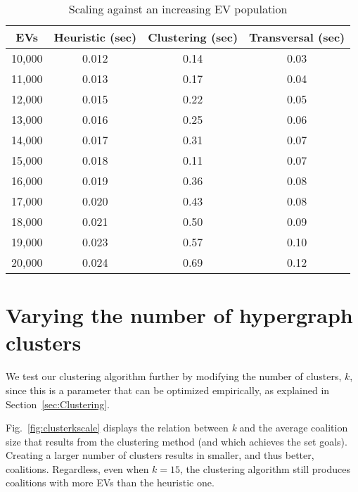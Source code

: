 	\begin{table}		
		\begin{center}
			\begin{tabular}{| c || c | c | c | }
				\hline
				EVs   & Heuristic (sec) & Clustering (sec) & Transversal (sec) \\ \hline
				10,000 & 0.012 & 0.14 & 0.03  \\ \hline
				11,000 & 0.013 & 0.17 & 0.04\\ \hline
				12,000 & 0.015 & 0.22 & 0.05\\ \hline
				13,000 & 0.016 & 0.25 & 0.06  \\ \hline
				14,000 & 0.017 & 0.31 & 0.07\\ \hline
				15,000 & 0.018 & 0.11 & 0.07\\ \hline
				16,000 & 0.019 & 0.36 & 0.08 \\ \hline
				17,000 & 0.020 & 0.43 & 0.08\\ \hline
				18,000 & 0.021 & 0.50 & 0.09 \\ \hline
				19,000 & 0.023 & 0.57 & 0.10  \\ \hline
				20,000 & 0.024 & 0.69 & 0.12\\ \hline
			\end{tabular}
		\end{center}
		\caption{Scaling against an increasing EV population\label{tab:popscale}}
	\end{table}

\section{Varying the number of hypergraph clusters} \label{sec:results_modifications}
We test our clustering algorithm further by modifying the number of clusters, $k$, since this is a parameter that can be optimized empirically, as explained in Section~\ref{sec:Clustering}.

Fig.~\ref{fig:clusterkscale} displays the relation between \textit{k} and the average coalition size that results from the clustering method (and which achieves the set goals). Creating a larger number of clusters results in smaller, and thus better, coalitions. Regardless, even when $k=15$, the clustering algorithm still produces coalitions with more EVs than the heuristic one.%
